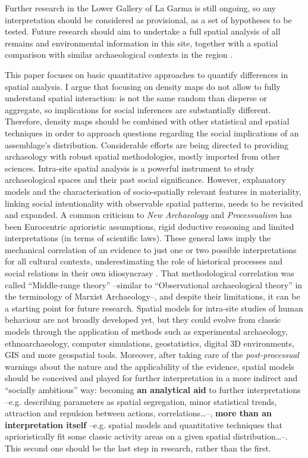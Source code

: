 Further research in the Lower Gallery of La Garma is still ongoing, so any interpretation should be considered as provisional, as a set of hypotheses to be tested. Future research should aim to undertake a full spatial analysis of all remains and environmental information in this site, together with a spatial comparison with similar archaeological contexts in the region \parencites[see][]{Arias_2005}{Arias_2009}. 

This paper focuses on basic quantitative approaches to quantify differences in spatial analysis. I argue that focusing on density maps do not allow to fully understand spatial interaction: is not the same random than disperse or aggregate, so implications for social inferences are substantially different. Therefore, density maps should be combined with other statistical and spatial techniques in order to approach questions regarding the social implications of an assemblage’s distribution. Considerable efforts are being directed to providing archaeology with robust spatial methodologies, mostly imported from other sciences. Intra-site spatial analysis is a powerful instrument to study archaeological spaces and their past social significance. However, explanatory models and the characterisation of socio-spatially relevant features in materiality, linking social intentionality with observable spatial patterns, needs to be revisited and expanded. A common criticism to \textit{New Archaeology} and \textit{Processualism} has been Eurocentric aprioristic assumptions, rigid deductive reasoning and limited interpretations (in terms of scientific laws). These general laws imply the mechanical correlation of an evidence to just one or two possible interpretations for all cultural contexts, underestimating the role of historical processes and social relations in their own idiosyncrasy \parencites{Hodder_2003}{Trigger_2006}. That methodological correlation was called “Middle-range theory” –similar to “Observational archaeological theory” in the terminology of Marxist Archaeology–, and despite their limitations, it can be a starting point for future research. Spatial models for intra-site studies of human behaviour are not broadly developed yet, but they could evolve from classic models through the application of methods such as experimental archaeology, ethnoarchaeology, computer simulations, geostatistics, digital 3D environments, GIS and more geospatial tools. Moreover, after taking care of the \textit{post-processual} warnings about the nature and the applicability of the evidence, spatial models should be conceived and played for further interpretation in a more indirect and “socially ambitious” way: becoming \textbf{an analytical aid} to further interpretations –e.g. describing parameters as spatial segregation, minor statistical trends, attraction and repulsion between actions, correlations…–, \textbf{more than an interpretation itself} –e.g. spatial models and quantitative techniques that aprioristically fit some classic activity areas on a given spatial distribution…–. This second one should be the last step in research, rather than the first.

